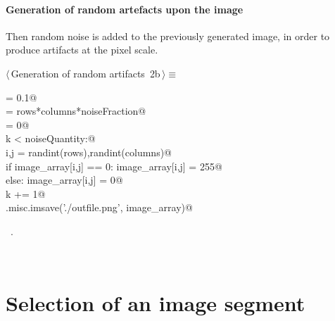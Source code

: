 \documentclass[11pt,oneside]{article}	%
\begin{document}
\paragraph{Generation of random artefacts upon the image}

Then random noise is added to the previously generated image, in order to produce artifacts at the pixel scale. 

\begin{flushleft} \small
\begin{minipage}{\linewidth} \label{scrap2}
\protect{}$\langle\,$Generation of random artifacts\nobreak\ {\footnotesize 2b}$\,\rangle\equiv$
\vspace{-1ex}
\begin{list}{}{} \item
\mbox{}\verb@noiseFraction = 0.1@\\
\mbox{}\verb@noiseQuantity = rows*columns*noiseFraction@\\
\mbox{}\verb@k = 0@\\
\mbox{}\verb@while k < noiseQuantity:@\\
\mbox{}\verb@   i,j = randint(rows),randint(columns)@\\
\mbox{}\verb@   if image_array[i,j] == 0: image_array[i,j] = 255@\\
\mbox{}\verb@   else: image_array[i,j] = 0@\\
\mbox{}\verb@   k += 1@\\
\mbox{}\verb@scipy.misc.imsave('./outfile.png', image_array)@\\
\mbox{}\verb@@{\NWsep}
\end{list}
\vspace{-1ex}
\footnotesize\addtolength{\baselineskip}{-1ex}
\begin{list}{}{\setlength{\itemsep}{-\parsep}\setlength{\itemindent}{-\leftmargin}}
\item \NWtxtMacroRefIn\ .
\end{list}
\end{minipage}\\[4ex]
\end{flushleft}


\section{Selection of an image segment}
\end{document}
